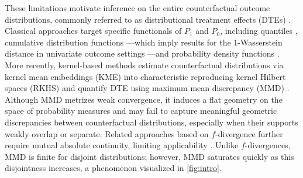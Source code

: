 \documentclass{article}
\theoremstyle{plain}
\theoremstyle{definition}
\theoremstyle{remark}
\newcommand{\1}{\mathbbm{1}}
\theoremstyle{plain}
\theoremstyle{definition}
\begin{document}
These limitations motivate inference on the entire counterfactual outcome distributions, commonly referred to as distributional treatment effects (DTEs) \cite{abadie2002bootstrap}. Classical approaches target specific functionals of $P_1$ and $P_0$, including quantiles \cite{firpo2007efficient}, cumulative distribution functions \cite{chernozhukov2013inference}---which imply results for the 1-Wasserstein distance in univariate outcome settings \citep{lin2023causal,balakrishnan2025conservative}---and probability density functions \cite{robins2001comment,kennedy2023semiparametric}. More recently, kernel-based methods estimate counterfactual distributions via kernel mean embeddings (KME) into characteristic reproducing kernel Hilbert spaces (RKHS) \cite{muandet2017kernel} and quantify DTE using maximum mean discrepancy (MMD) \cite{fawkes2024doubly,martinez2023efficient,luedtke2024one}. Although MMD metrizes weak convergence, it induces a flat geometry on the space of probability measures and may fail to capture meaningful geometric discrepancies between counterfactual distributions, especially when their supports weakly overlap or separate. Related approaches based on $f$-divergence further require mutual absolute continuity, limiting applicability \cite{kennedy2023semiparametric}.
Unlike $f$-divergences, MMD is finite for disjoint distributions; however, MMD saturates quickly as this disjointness increases, a phenomenon visualized in \cref{fig:intro}. 
\end{document}
